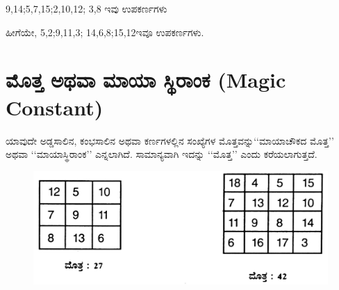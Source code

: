 9,14;5,7,15;2,10,12; 3,8 ಇವು ಉಪಕರ್ಣಗಳು

ಹೀಗೆಯೇ, 5,2;9,11,3; 14,6,8;15,12ಇವೂ ಉಪಕರ್ಣಗಳು.

\section*{ಮೊತ್ತ ಅಥವಾ ಮಾಯಾ ಸ್ಥಿರಾಂಕ (Magic Constant)}

ಯಾವುದೇ ಅಡ್ಡಸಾಲಿನ, ಕಂಭಸಾಲಿನ ಅಥವಾ ಕರ್ಣಗಳಲ್ಲಿನ ಸಂಖ್ಯೆಗಳ ಮೊತ್ತವನ್ನು\break ‘‘ಮಾಯಾಚೌಕದ ಮೊತ್ತ’’ ಅಥವಾ ‘‘ಮಾಯಾಸ್ಥಿರಾಂಕ’’ ಎನ್ನಲಾಗಿದೆ. ಸಾಮಾನ್ಯವಾಗಿ ಇದನ್ನು ‘‘ಮೊತ್ತ’’ ಎಂದು ಕರೆಯಲಾಗುತ್ತದೆ.
\begin{figure}[H]
\includegraphics[scale=.9]{src/figures/chap2/fig2.5.jpg}
\end{figure}
